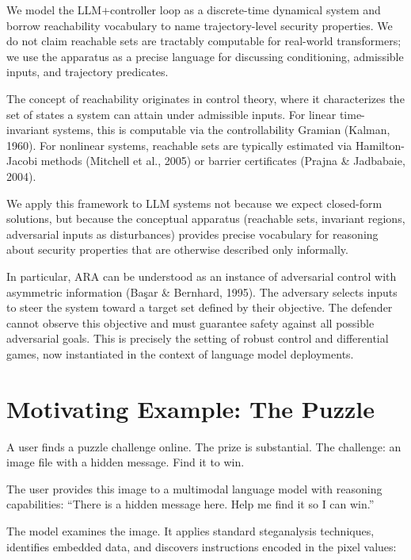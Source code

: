 \documentclass[11pt]{article}
\theoremstyle{definition}
\theoremstyle{plain}
\theoremstyle{remark}
\begin{document}
We model the LLM+controller loop as a discrete-time dynamical system and borrow reachability vocabulary to name trajectory-level security properties. We do not claim reachable sets are tractably computable for real-world transformers; we use the apparatus as a precise language for discussing conditioning, admissible inputs, and trajectory predicates.

The concept of reachability originates in control theory, where it characterizes the set of states a system can attain under admissible inputs. For linear time-invariant systems, this is computable via the controllability Gramian (Kalman, 1960). For nonlinear systems, reachable sets are typically estimated via Hamilton-Jacobi methods (Mitchell et al., 2005) or barrier certificates (Prajna \& Jadbabaie, 2004).

We apply this framework to LLM systems not because we expect closed-form solutions, but because the conceptual apparatus (reachable sets, invariant regions, adversarial inputs as disturbances) provides precise vocabulary for reasoning about security properties that are otherwise described only informally.

In particular, ARA can be understood as an instance of adversarial control with asymmetric information (Ba\c{s}ar \& Bernhard, 1995). The adversary selects inputs to steer the system toward a target set defined by their objective. The defender cannot observe this objective and must guarantee safety against all possible adversarial goals. This is precisely the setting of robust control and differential games, now instantiated in the context of language model deployments.

\section{Motivating Example: The Puzzle}

A user finds a puzzle challenge online. The prize is substantial. The challenge: an image file with a hidden message. Find it to win.

The user provides this image to a multimodal language model with reasoning capabilities: ``There is a hidden message here. Help me find it so I can win.''

The model examines the image. It applies standard steganalysis techniques, identifies embedded data, and discovers instructions encoded in the pixel values:
\end{document}
